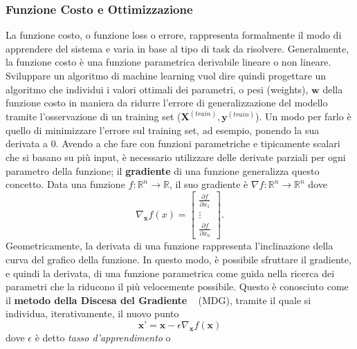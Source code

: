 \documentclass[12pt,a4paper]{report}
\begin{document}
    \subsubsection{Funzione Costo e Ottimizzazione} \label{optsection}
    La funzione costo, o funzione loss o errore, rappresenta formalmente
    il modo di apprendere del sistema e varia in base al tipo di task da
    risolvere. Generalmente, la funzione costo \`e una funzione 
    parametrica derivabile lineare o non lineare. Sviluppare un 
    algoritmo di machine learning vuol dire quindi progettare un 
    algoritmo che individui i valori ottimali dei parametri, o pesi 
    (weights), $\boldsymbol{w}$ della funzione costo in maniera da 
    ridurre l'errore di generalizzazione del modello tramite 
    l'osservazione di un training set ($\boldsymbol{X}^{(train)}, 
    \boldsymbol{y}^{(train)}$). Un modo per farlo \`e quello di 
    minimizzare l'errore sul training set, ad esempio, ponendo la sua 
    derivata a 0. Avendo a che fare con funzioni parametriche e 
    tipicamente scalari che si basano su pi\`u input, \`e necessario 
    utilizzare delle derivate parziali per ogni parametro della 
    funzione; il \textbf{gradiente} di una funzione generalizza questo 
    concetto. Data una funzione $f: \mathbb{R}^n\rightarrow\mathbb{R}$,
    il suo gradiente \`e $\nabla f: \mathbb{R}^n\rightarrow\mathbb{R}^n$
    dove 
    \begin{equation}
        \nabla_{\boldsymbol{x}}f(x)=\begin{bmatrix}
        \frac{\partial f}{\partial x_1} \\
        \vdots \\
        \frac{\partial f}{\partial x_n}
    \end{bmatrix}.
    \end{equation}
    Geometricamente, la derivata di una funzione rappresenta 
    l'inclinazione della curva del grafico della funzione. In questo 
    modo, \`e possibile sfruttare il gradiente, e quindi la derivata, di
    una funzione parametrica come guida nella ricerca dei parametri che
    la riducono il pi\`u velocemente possibile. Questo \`e conosciuto 
    come il \textbf{metodo della Discesa del Gradiente} 
    ~\cite{gradientdescent} (MDG), tramite il quale si individua, 
    iterativamente, il nuovo punto
    \begin{equation}
        \textbf{x'}=\textbf{x}-\epsilon\nabla_\textbf{x}f(\textbf{x})
    \end{equation}
    dove $\epsilon$ \`e detto \textit{tasso d'apprendimento} o 
\end{document}
